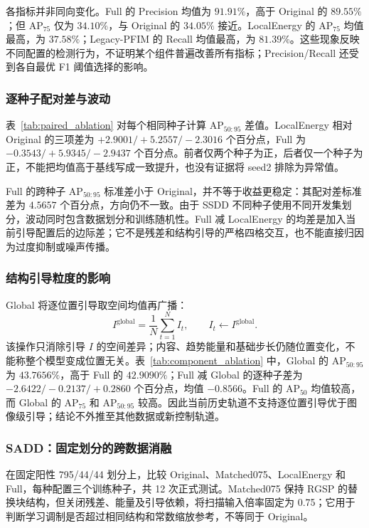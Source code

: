 各指标并非同向变化。Full 的 Precision 均值为 $91.91\%$，高于 Original 的 $89.55\%$；但 AP$_{75}$ 仅为 $34.10\%$，与 Original 的 $34.05\%$ 接近。LocalEnergy 的 AP$_{75}$ 均值最高，为 $37.58\%$；Legacy-PFIM 的 Recall 均值最高，为 $81.39\%$。这些现象反映不同配置的检测行为，不证明某个组件普遍改善所有指标；Precision/Recall 还受到各自最优 F1 阈值选择的影响。



\subsubsection{逐种子配对差与波动}
表~\ref{tab:paired_ablation} 对每个相同种子计算 AP$_{50:95}$ 差值。LocalEnergy 相对 Original 的三项差为 $+2.9001/+5.2557/-2.3016$ 个百分点，Full 为 $-0.3543/+5.9345/-2.9437$ 个百分点。前者仅两个种子为正，后者仅一个种子为正，不能把均值高于基线写成一致提升，也没有证据将 seed2 排除为异常值。

Full 的跨种子 AP$_{50:95}$ 标准差小于 Original，并不等于收益更稳定：其配对差标准差为 $4.5657$ 个百分点，方向仍不一致。由于 SSDD 不同种子使用不同开发集划分，波动同时包含数据划分和训练随机性。Full 减 LocalEnergy 的均差是加入当前引导配置后的边际差；它不是残差和结构引导的严格四格交互，也不能直接归因为过度抑制或噪声传播。


\subsubsection{结构引导粒度的影响}\label{sec:guidance_granularity}
Global 将逐位置引导取空间均值再广播：
\begin{equation}
I^{\mathrm{global}}=\frac{1}{N}\sum_{t=1}^{N}I_t,\qquad
I_t\leftarrow I^{\mathrm{global}}.
\label{eq:global_guidance}
\end{equation}
该操作只消除引导 $I$ 的空间差异；内容、趋势能量和基础步长仍随位置变化，不能称整个模型变成位置无关。表~\ref{tab:component_ablation} 中，Global 的 AP$_{50:95}$ 为 $43.7656\%$，高于 Full 的 $42.9090\%$；Full 减 Global 的逐种子差为 $-2.6422/-0.2137/+0.2860$ 个百分点，均值 $-0.8566$。Full 的 AP$_{50}$ 均值较高，而 Global 的 AP$_{75}$ 和 AP$_{50:95}$ 较高。因此当前历史轨道不支持逐位置引导优于图像级引导；结论不外推至其他数据或新控制轨道。

\subsubsection{SADD：固定划分的跨数据消融}\label{sec:sadd_ablation}
在固定阳性 795/44/44 划分上，比较 Original、Matched075、LocalEnergy 和 Full，每种配置三个训练种子，共 12 次正式测试。Matched075 保持 RGSP 的替换块结构，但关闭残差、能量及引导依赖，将扫描输入倍率固定为 0.75；它用于判断学习调制是否超过相同结构和常数缩放参考，不等同于 Original。

